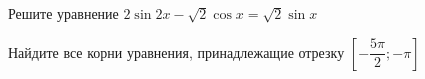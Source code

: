 \begin{ex}
	\begin{condition}
		\begin{enumcols}[label=\asbuk*)]
			\item Решите уравнение \( 2\sin 2x -\sqrt{2}\cos x=\sqrt{2}\sin x \)
			\item Найдите все корни уравнения, принадлежащие отрезку \( \left[-\dfrac{5\pi}{2};-\pi\right] \)
		\end{enumcols}
	\end{condition}
\end{ex}